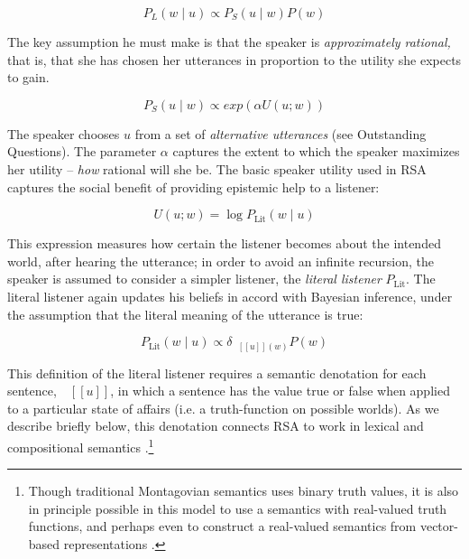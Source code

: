 \documentclass[]{elsarticle}
\newcommand{\denote}[1]{\mbox{ $[\![ #1 ]\!]$}}
\begin{document}
$$P_L(w\mid u) \propto P_S(u \mid w)P(w)$$

The key assumption he must make is that the speaker is
\emph{approximately rational,} that is, that she has chosen her
utterances in proportion to the utility she expects to gain.

$$P_S(u\mid w) \propto exp(\alpha
U(u;w))$$

The speaker chooses $u$ from a set of \emph{alternative utterances}
(see Outstanding Questions). The parameter $\alpha$
captures the extent to which the speaker maximizes her utility --
\emph{how} rational will she be. The basic speaker utility used in RSA
captures the social benefit of providing epistemic help to a listener:

$$U(u;w) = \log P_{\text{Lit}}(w \mid u)$$

This expression measures how certain the listener becomes about the intended world, after hearing the utterance; in order to avoid an infinite recursion, the speaker is
assumed to consider a simpler listener, the \emph{literal listener}
$P_{\text{Lit}}$. The literal listener again updates his beliefs in
accord with Bayesian inference, under the assumption that the literal
meaning of the utterance is true:

$$P_{\text{Lit}}(w\mid u) \propto \delta_{\denote{u}(w)}P(w)$$

This definition of the literal listener requires a semantic denotation
for each sentence, $\denote{u}$, in which a sentence
has the value true or false when applied to a particular state of
affairs (i.e. a truth-function on possible worlds). As we describe
briefly below, this denotation connects RSA to work in lexical and
compositional semantics \citep{heim1998,dowty2012}.\footnote{Though traditional Montagovian semantics uses binary truth values, it is also in principle possible in this model to use a semantics with real-valued truth functions, and perhaps even to construct a real-valued semantics from vector-based representations \citep{monroe2015}.}
\end{document}
